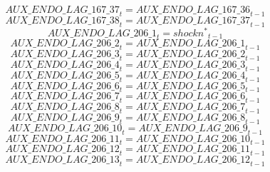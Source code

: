 \begin{dmath}
{AUX\_ENDO\_LAG\_167\_37}_{t}={AUX\_ENDO\_LAG\_167\_36}_{t-1}
\end{dmath}
\begin{dmath}
{AUX\_ENDO\_LAG\_167\_38}_{t}={AUX\_ENDO\_LAG\_167\_37}_{t-1}
\end{dmath}
\begin{dmath}
{AUX\_ENDO\_LAG\_206\_1}_{t}={{shockn^*}}_{t-1}
\end{dmath}
\begin{dmath}
{AUX\_ENDO\_LAG\_206\_2}_{t}={AUX\_ENDO\_LAG\_206\_1}_{t-1}
\end{dmath}
\begin{dmath}
{AUX\_ENDO\_LAG\_206\_3}_{t}={AUX\_ENDO\_LAG\_206\_2}_{t-1}
\end{dmath}
\begin{dmath}
{AUX\_ENDO\_LAG\_206\_4}_{t}={AUX\_ENDO\_LAG\_206\_3}_{t-1}
\end{dmath}
\begin{dmath}
{AUX\_ENDO\_LAG\_206\_5}_{t}={AUX\_ENDO\_LAG\_206\_4}_{t-1}
\end{dmath}
\begin{dmath}
{AUX\_ENDO\_LAG\_206\_6}_{t}={AUX\_ENDO\_LAG\_206\_5}_{t-1}
\end{dmath}
\begin{dmath}
{AUX\_ENDO\_LAG\_206\_7}_{t}={AUX\_ENDO\_LAG\_206\_6}_{t-1}
\end{dmath}
\begin{dmath}
{AUX\_ENDO\_LAG\_206\_8}_{t}={AUX\_ENDO\_LAG\_206\_7}_{t-1}
\end{dmath}
\begin{dmath}
{AUX\_ENDO\_LAG\_206\_9}_{t}={AUX\_ENDO\_LAG\_206\_8}_{t-1}
\end{dmath}
\begin{dmath}
{AUX\_ENDO\_LAG\_206\_10}_{t}={AUX\_ENDO\_LAG\_206\_9}_{t-1}
\end{dmath}
\begin{dmath}
{AUX\_ENDO\_LAG\_206\_11}_{t}={AUX\_ENDO\_LAG\_206\_10}_{t-1}
\end{dmath}
\begin{dmath}
{AUX\_ENDO\_LAG\_206\_12}_{t}={AUX\_ENDO\_LAG\_206\_11}_{t-1}
\end{dmath}
\begin{dmath}
{AUX\_ENDO\_LAG\_206\_13}_{t}={AUX\_ENDO\_LAG\_206\_12}_{t-1}
\end{dmath}

